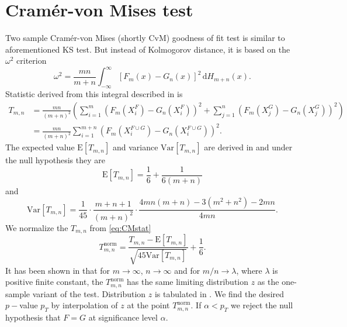 \section{Cram\'{e}r-von Mises test}
Two sample Cram\'{e}r-von Mises (shortly CvM) goodness of fit test is similar to aforementioned KS test. But instead of Kolmogorov distance, it is based on the $\omega^2$ criterion
\begin{equation}
\omega^2 = \frac{mn}{m+n} \int_{-\infty}^\infty \left[F_m(x) - G_n(x) \right]^2 \,\mathrm{d} H_{m+n}(x).
\end{equation} 
Statistic derived from this integral described in \cite{Anderson1962} is
\begin{align}
T_{m,n} & = \frac{mn}{(m+n)^2}\left( \sum_{i=1}^m \left( F_m\left(X^F_i\right) - G_n\left(X^F_i\right)\right)^2 + \sum_{j=1}^n \left( F_m\left(X^G_j\right) - G_n\left(X^G_j\right)\right)^2 \right) \\
& = \frac{mn}{(m+n)^2} \sum_{i=1}^{m+n} \left( F_m\left(X^{F\cup G}_i\right) - G_n\left(X^{F\cup G}_i\right)\right)^2 .
\label{eq:CMstat} %
\end{align}
The expected value $\mathrm{E} [T_{m,n}]$ and variance $\mathrm{Var} [T_{m,n}]$ are derived in \cite{Anderson1962} and  under the null hypothesis they are 
\begin{equation}
\mathrm{E} [T_{m,n}] = \frac{1}{6} + \frac{1}{6(m+n)}
\end{equation}
and
\begin{equation}
\mathrm{Var} [T_{m,n}] = \frac{1}{45} \cdot \frac{m+n+1}{(m+n)^2} \cdot \frac{4mn(m+n) - 3(m^2 + n^2)-2mn}{4mn}.
\end{equation}
We normalize the $T_{m,n}$ from \eqref{eq:CMstat}
\begin{equation}
T_{m,n}^\mathrm{norm} = \frac{T_{m,n}-\mathrm{E}[T_{m,n}]}{\sqrt{45\mathrm{Var}[T_{m,n}]}} + \frac{1}{6}.
\end{equation}
It has been shown in \cite{Rosenblatt1952} that for $m \rightarrow \infty$, $n \rightarrow \infty$ and for ${m}/{n} \rightarrow \lambda$, where $\lambda$ is positive finite constant, the  $T_{m,n}^\mathrm{norm}$ has the same limiting distribution $z$ as the one-sample variant of the test. Distribution $z$ is tabulated  in \cite{AndersonDarling1952}. We find the desired $p-$value $p_T$ by interpolation of $z$ at the point $T_{m,n}^\mathrm{norm}$. If $\alpha < p_T$ we reject the null hypothesis that $F = G $ at significance level $\alpha$.

